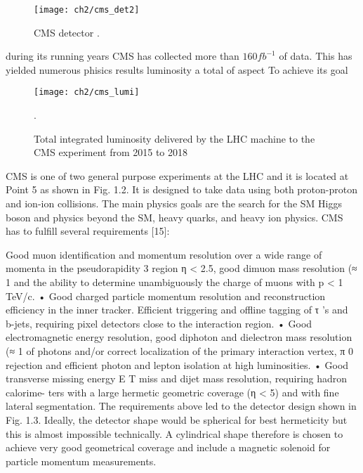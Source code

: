 \begin{figure}[!h]
	\centering
	\texttt{[image: ch2/cms\_det2]}
	\caption[CMS detector]{CMS detector \cite{cms_web}.}
	\label{cms_det}
\end{figure}

during its running years CMS has collected more than $ 160 fb^{-1}$ of data. This has yielded numerous phisics results luminosity a total of aspect To achieve its goal
\begin{figure}[!h]
	\centering
	\texttt{[image: ch2/cms\_lumi]}
	\caption[LHC luminosity]{Total integrated luminosity delivered by the LHC machine to the CMS experiment from 2015 to 2018 \cite{cms_lumi}}.
	\label{lumi2016}
\end{figure}






CMS is one of two general purpose experiments at the LHC and it is located at Point 5 as
shown in Fig. 1.2. It is designed to take data using both proton-proton and ion-ion collisions.
The main physics goals are the search for the SM Higgs boson and physics beyond the SM,
heavy quarks, and heavy ion physics.
CMS has to fulfill several requirements [15]:


Good muon identification and momentum resolution over a wide range of momenta in
the pseudorapidity 3 region η < 2.5, good dimuon mass resolution (≈ 1%
and the ability to determine unambiguously the charge of muons with p < 1 TeV/c.
• Good charged particle momentum resolution and reconstruction efficiency in the inner
tracker. Efficient triggering and offline tagging of τ ’s and b-jets, requiring pixel detectors
close to the interaction region.
• Good electromagnetic energy resolution, good diphoton and dielectron mass resolution
(≈ 1%
of photons and/or correct localization of the primary interaction vertex, π 0 rejection and
efficient photon and lepton isolation at high luminosities.
• Good transverse missing energy E T miss and dijet mass resolution, requiring hadron calorime-
ters with a large hermetic geometric coverage (η < 5) and with fine lateral segmentation.
The requirements above led to the detector design shown in Fig. 1.3. Ideally, the detector
shape would be spherical for best hermeticity but this is almost impossible technically. A
cylindrical shape therefore is chosen to achieve very good geometrical coverage and include a
magnetic solenoid for particle momentum measurements.

